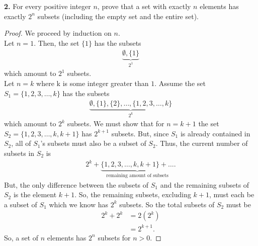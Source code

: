 \documentclass[12pt, letterpaper]{article}
\begin{document}
\textbf{2.} For every positive integer $n$, prove that a set with exactly $n$ elements has exactly $2^{n}$ subsets (including the empty set and the entire set).
\begin{proof}
    We proceed by induction on $n$. \\
     Let $n = 1$. Then, the set $\{1\}$ has the subsets
    \begin{align*}
        \underbrace{\emptyset, \{1\}}_{2^{1}}
    \end{align*}
    which amount to $2^{1}$ subsets. \\
     Let $n = k$ where k is some integer greater than $1$. Assume the set $S_{1} = \{1, 2, 3,\ldots, k\}$ has the subsets
    \begin{align*}
        \underbrace{\emptyset, \{1\}, \{2\}, \ldots, \{1, 2, 3,\ldots, k\}}_{2^{k}}
    \end{align*}
    which amount to $2^{k}$ subsets. We must show that for $n = k + 1$ the set $S_{2} = \{1, 2, 3,\ldots, k, k + 1\}$ has $2^{k+1}$ subsets. But, since $S_{1}$ is already contained in $S_{2}$, all of $S_{1}$'s subsets must also be a subset of $S_{2}$. Thus, the current number of subsets in $S_{2}$ is
    \begin{align*}
        2^{k} + \underbrace{\{1, 2, 3, \ldots, k, k+1\} + \ldots}_{\text{remaining amount of subsets}}.
    \end{align*}
    But, the only difference between the subsets of $S_{1}$ and the remaining subsets of $S_{2}$ is the element $k + 1$. So, the remaining subsets, excluding $k + 1$, must each be a subset of $S_{1}$ which we know has $2^{k}$ subsets. So the total subsets of $S_{2}$ must be
    \begin{align*}
        2^{k} + 2^{k} &= 2(2^{k}) \\
        &= 2^{k+1}.
    \end{align*}
    So, a set of $n$ elements has $2^{n}$ subsets for $n > 0$.
\end{proof}
\end{document}
